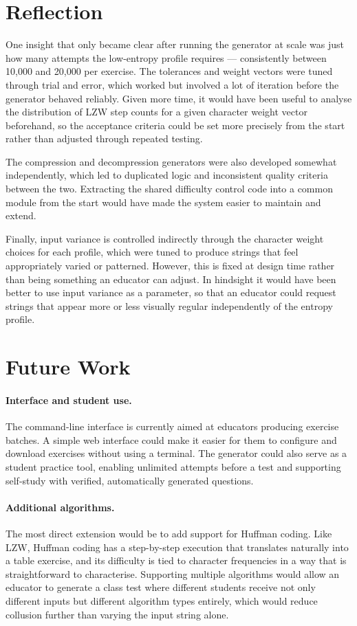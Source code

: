 \documentclass{l4proj}
\begin{document}
\section{Reflection}

One insight that only became clear after running the generator at scale was just how many attempts the low-entropy profile requires — consistently between 10,000 and 20,000 per exercise. The tolerances and weight vectors were tuned through trial and error, which worked but involved a lot of iteration before the generator behaved reliably. Given more time, it would have been useful to analyse the distribution of LZW step counts for a given character weight vector beforehand, so the acceptance criteria could be set more precisely from the start rather than adjusted through repeated testing.

The compression and decompression generators were also developed somewhat independently, which led to duplicated logic and inconsistent quality criteria between the two. Extracting the shared difficulty control code into a common module from the start would have made the system easier to maintain and extend.

Finally, input variance is controlled indirectly through the character weight choices for each profile, which were tuned to produce strings that feel appropriately varied or patterned. However, this is fixed at design time rather than being something an educator can adjust. In hindsight it would have been better to use input variance as a parameter, so that an educator could request strings that appear more or less visually regular independently of the entropy profile.

\section{Future Work}

\paragraph{Interface and student use.} 
The command-line interface is currently aimed at educators producing exercise batches. A simple web interface could make it easier for them to configure and download exercises without using a terminal. The generator could also serve as a student practice tool, enabling unlimited attempts before a test and supporting self-study with verified, automatically generated questions.

\paragraph{Additional algorithms.}
The most direct extension would be to add support for Huffman coding. Like LZW, Huffman coding has a step-by-step execution that translates naturally into a table exercise, and its difficulty is tied to character frequencies in a way that is straightforward to characterise. Supporting multiple algorithms would allow an educator to generate a class test where different students receive not only different inputs but different algorithm types entirely, which would reduce collusion further than varying the input string alone.
\end{document}
